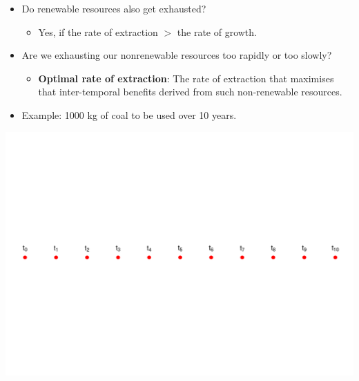 \documentclass[
  ignorenonframetext,
]{beamer}
\providecommand{\tightlist}{%
  \setlength{\itemsep}{0pt}\setlength{\parskip}{0pt}}\usepackage{longtable,booktabs,array}
\begin{document}
\begin{frame}
\begin{itemize}
\tightlist
\item
  Do renewable resources also get exhausted?

  \begin{itemize}
  \tightlist
  \item
    Yes, if the rate of extraction \(>\) the rate of growth.
  \end{itemize}
\item
  Are we exhausting our nonrenewable resources too rapidly or too
  slowly?

  \begin{itemize}
  \tightlist
  \item
    \textbf{Optimal rate of extraction}: The rate of extraction that
    maximises that inter-temporal benefits derived from such
    non-renewable resources.
  \end{itemize}
\end{itemize}
\end{frame}

\begin{frame}
\begin{itemize}
\tightlist
\item
  Example: 1000 kg of coal to be used over 10 years.
\end{itemize}

\includegraphics{intro_files/figure-beamer/unnamed-chunk-2-1.pdf}
\end{frame}
\end{document}
